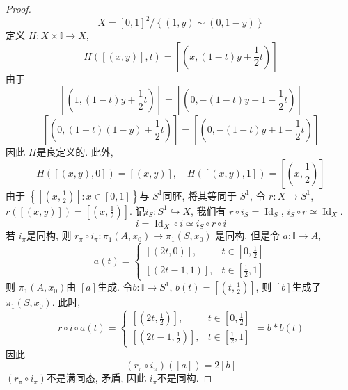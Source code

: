 \documentclass[../main.tex]{subfiles}
\begin{document}
\begin{proof}
    \[
    X= [0,1]^{2}/\left\{ \left( 1,y \right)\sim \left( 0,1-y \right)   \right\}
    \]定义 \(  H: X\times \mathbb{I}\to X  \), \[
    H\left( [\left( x,y \right) ],t \right)=\left[ \left( x,  \left( 1-t \right)y+ \frac{1 }{2 }t  \right) \right] 
    \] 由于 \[
    \left[ \left( 1, \left( 1-t \right)y+ \frac{1 }{2 }t   \right)  \right]= \left[ \left( 0, -\left( 1-t \right)y+ 1-\frac{1 }{2 }t  \right)  \right]  
    \] \[
    \left[ \left( 0,\left( 1-t \right)\left( 1-y \right)+ \frac{1 }{2 }t    \right)  \right]=  \left[ \left( 0, -\left( 1-t \right)y + 1-\frac{1 }{2 }t   \right)  \right] 
    \]因此 \(  H  \)是良定义的. 此外,  \[
    H\left( \left[ \left( x,y \right),0  \right]  \right)= \left[ \left( x,y \right)  \right],\quad H\left( \left[  \left( x,y \right),1 \right]  \right)= \left[ \left( x,\frac{1 }{2 }  \right)  \right]    
    \]由于 \(  \left\{ \left[ \left( x,\frac{1 }{2 }  \right)  \right] : x\in \left[ 0,1 \right]  \right\}  \)与 \(  S^{1}  \)同胚, 将其等同于 \(  S^{1}  \), 令 \(  r:X\to S^{1}  \), \(  r\left( [\left( x,y \right) ] \right)=\left[ \left( x,\frac{1 }{2 }  \right) \right]  \).  记\(  i_{S}:S^{1}\hookrightarrow X  \), 我们有 \(  r\circ i_{S}= \operatorname{Id}_{S}  \), \(  i_{S}\circ r\simeq \operatorname{Id}_{X}  \).  \[
    i= \operatorname{Id}_{X}\circ i\simeq i_{S}\circ r \circ i
    \]若 \(  i_{ \pi }  \)是同构, 则 \(r_{ \pi }\circ i_{ \pi }: \pi _1 \left( A,x_0 \right)\to  \pi _1 \left( S,x_0 \right)    \)  是同构. 但是令 \(  a:\mathbb{I}\to A  \), \[
    a\left( t \right)= \begin{cases} [\left(2 t,0 \right) ],& t\in \left[ 0,\frac{1 }{2 }  \right]\\ 
     \left[ \left(2t-1,1  \right)  \right],& t\in \left[ \frac{1 }{2 },1  \right]    \end{cases}  
    \] 则 \(   \pi _1 \left( A,x_0 \right)   \)由 \(  [a]  \)生成. 令\(  b: \mathbb{I}\to S^{1}  \),   \(  b\left( t \right)= \left[ \left( t,\frac{1 }{2 }  \right)  \right]    \), 则   \(  [b]  \)生成了 \(   \pi _1 \left( S,x_0 \right)   \). 此时, \[
    r\circ i\circ a\left( t \right) = \begin{cases} [\left( 2t,\frac{1 }{2 }  \right) ],& t\in \left[ 0,\frac{1 }{2 }  \right]\\ 
     \left[ \left( 2t-1,\frac{1 }{2 }  \right)  \right],& t\in \left[ \frac{1 }{2 },1  \right]    \end{cases}=  b*b  \left( t \right) 
    \] 因此 \[
    \left( r_{ \pi }\circ i_{ \pi } \right)\left( [a] \right)= 2[b]  
    \]\(  \left( r_{ \pi }\circ i_{ \pi } \right)   \)不是满同态, 矛盾,  因此 \(  i_{ \pi }  \)不是同构.  
\end{proof}
\end{document}
